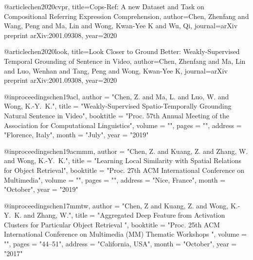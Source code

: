 @article{chen2020cvpr,
  title={Cops-Ref: A new Dataset and Task on Compositional Referring Expression Comprehension},
  author={Chen, Zhenfang and Wang, Peng and Ma, Lin and Wong, Kwan-Yee K and Wu, Qi},
  journal={arXiv preprint arXiv:2001.09308},
  year={2020}
}

@article{chen2020look,
  title={Look Closer to Ground Better: Weakly-Supervised Temporal Grounding of Sentence in Video},
  author={Chen, Zhenfang and Ma, Lin and Luo, Wenhan and Tang, Peng and Wong, Kwan-Yee K},
  journal={arXiv preprint arXiv:2001.09308},
  year={2020}
}

@inproceedings{chen19acl,
    author = "Chen, Z. and Ma, L. and Luo, W. and Wong, K.-Y.~K.",
    title = "Weakly-Supervised Spatio-Temporally Grounding Natural Sentence in Video",
    booktitle = "Proc. 57th Annual Meeting of the Association for Computational Linguistics",
    volume = "",
    pages = "",
    address = "Florence, Italy",
    month = "July",
    year = "2019"
}

@inproceedings{chen19acmmm,
    author = "Chen, Z. and Kuang, Z. and Zhang, W. and Wong, K.-Y.~K.",
    title = "Learning Local Similarity with Spatial Relations for Object Retrieval",
    booktitle = "Proc. 27th ACM International Conference on Multimedia",
    volume = "",
    pages = "",
    address = "Nice, France",
    month = "October",
    year = "2019"
}

@inproceedings{chen17mmtw,
    author = "Chen, Z and Kuang, Z. and Wong, K.-Y.~K. and Zhang, W.",
    title = "Aggregated Deep Feature from Activation Clusters for Particular Object Retrieval ",
    booktitle = "Proc. 25th ACM International Conference on Multimedia (MM) Thematic Workshops ",
    volume = "",
    pages = "44--51",
    address = "California, USA",
    month = "October",
    year = "2017"
}

